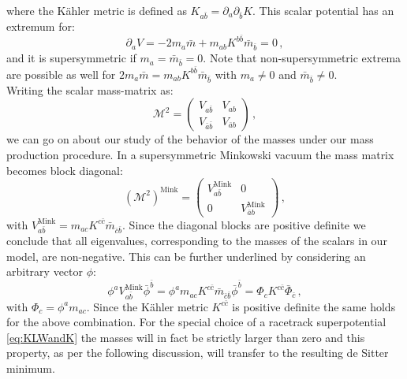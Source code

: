\documentclass[a4paper,12pt]{report}
\newcommand{\be}{\begin{equation}}
\newcommand{\ee}{\end{equation}}
\newcommand{\V}{\mathcal{V}}
\begin{document}
where the Kähler metric is defined as $K_{a\bar{b}} = \partial_a \partial_{\bar{b}}K$. This scalar potential has an extremum for:
\be 
\partial_a V = -2 m_a \bar{m} + m_{ab} K^{b\bar{b}} \bar{m}_{\bar{b}}=0\,,
\ee
and it is supersymmetric if $m_a = \bar{m}_{\bar{b}}=0$. Note that non-supersymmetric extrema are possible as well for $2 m_a \bar{m} = m_{ab} K^{b\bar{b}} \bar{m}_{\bar{b}}$ with $m_a \neq 0$ and $\bar{m}_{\bar{b}} \neq 0$.\\
Writing the scalar mass-matrix as:
\be 
\mathcal{M}^2 = \begin{pmatrix} V_{a\bar{b}} & V_{ab}\\V_{\bar{a}\bar{b}} & V_{\bar{a}b}\end{pmatrix}\,,
\ee
we can go on about our study of the behavior of the masses under our mass production procedure. In a supersymmetric Minkowski vacuum the mass matrix becomes block diagonal:
\be 
\left(\mathcal{M}^2\right)^{\text{Mink}} = \begin{pmatrix} V_{a\bar{b}}^{\text{Mink}} &0\\0 & V_{\bar{a}b}^{\text{Mink}}\end{pmatrix}\,,
\ee
with $V_{a\bar{b}}^{\text{Mink}} = m_{ac} K^{c\bar{c}}\bar{m}_{\bar{c}\bar{b}}$. Since the diagonal blocks are positive definite we conclude that all eigenvalues, corresponding to the masses of the scalars in our model, are non-negative. This can be further underlined by considering an arbitrary vector $\phi$:
\be 
\phi^a V_{a\bar{b}}^{\text{Mink}} \bar{\phi}^{\bar{b}} = \phi^a m_{ac} K^{c\bar{c}}\bar{m}_{\bar{c}\bar{b}} \bar{\phi}^{\bar{b}} = \Phi_c K^{c\bar{c}} \bar{\Phi}_{\bar{c}}\,,
\label{eq:MinkPosDef}
\ee
with $\Phi_c = \phi^a m_{ac}$. Since the Kähler metric $K^{c\bar{c}}$ is positive definite the same holds for the above combination. For the special choice of a racetrack superpotential \eqref{eq:KLWandK} the masses will in fact be strictly larger than zero and this property, as per the following discussion, will transfer to the resulting de Sitter minimum. 
\end{document}
